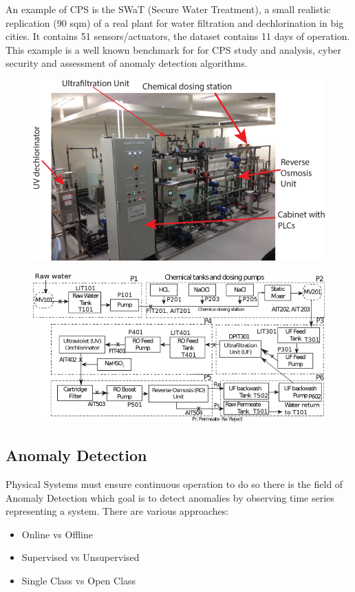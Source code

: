 An example of CPS is the SWaT (Secure Water Treatment), a small realistic replication (90
sqm) of a real plant for water filtration and dechlorination in big cities.
It contains 51 sensors/actuators, the dataset contains 11 days of operation.
This example is a well known benchmark for for CPS study and analysis, 
cyber security and assessment of anomaly detection algorithms.
\begin{minipage}[t]{0.4\textwidth}
    \begin{figure}[H]
        \includegraphics[width=\textwidth]{img/swat.png}
        \centering
    \end{figure}
\end{minipage}
\begin{minipage}[t]{0.5\textwidth}
    \begin{figure}[H]
        \includegraphics[width=\textwidth]{img/swat_schema.png}
        \centering
    \end{figure}    
\end{minipage}

\subsection{Anomaly Detection}
Physical Systems must ensure continuous operation to do so there is the field of 
Anomaly Detection which goal is to detect anomalies by observing time series representing a system.
There are various approaches:
\begin{itemize}
    \item Online vs Offline
    \item Supervised vs Unsupervised
    \item Single Class vs Open Class
\end{itemize}

